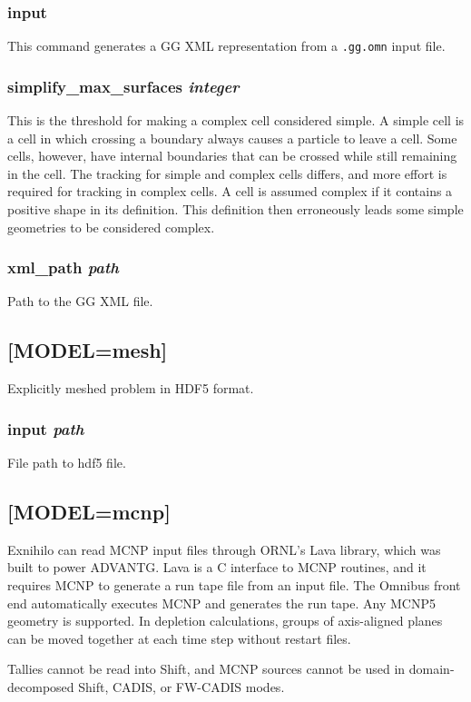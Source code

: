 \documentclass[10pt]{article}
\begin{document}
\subsubsection{input}
This command generates a GG XML representation from a \texttt{.gg.omn} input file. 

\subsubsection{simplify\_max\_surfaces \textit{integer}}
This is the threshold for making a complex cell considered simple. A simple cell is a cell in which crossing a boundary always causes a particle to leave a cell. Some cells, however, have internal boundaries that can be crossed while still remaining in the cell. The tracking for simple and complex cells differs, and more effort is required for tracking in complex cells. A cell is assumed complex if it contains a positive shape in its definition. This definition then erroneously leads some simple geometries to be considered complex.

\subsubsection{xml\_path \textit{path}}
Path to the GG XML file. 

\subsection{[MODEL=mesh]}
Explicitly meshed problem in HDF5 format.

\subsubsection{input \textit{path}}
File path to hdf5 file.

\subsection{[MODEL=mcnp]}
Exnihilo can read MCNP input files through ORNL's Lava library, which was built to power ADVANTG. Lava is a C interface to MCNP routines, and it requires MCNP to generate a run tape file from an input file. The Omnibus front end automatically executes MCNP and generates the run tape. Any MCNP5 geometry is supported. In depletion calculations, groups of axis-aligned planes can be moved together at each time step without restart files. 

Tallies cannot be read into Shift, and MCNP sources cannot be used in domain-decomposed Shift, CADIS, or FW-CADIS modes.
\end{document}
